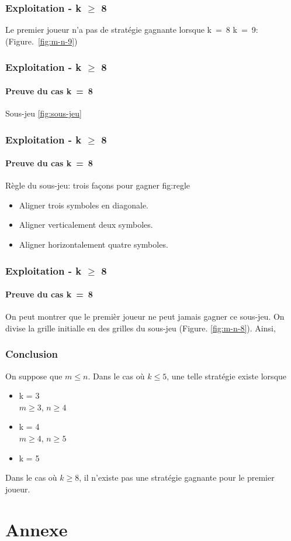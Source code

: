 \documentclass{beamer}
\begin{document}
\begin{frame}
    \frametitle{Exploitation - k $\ge$ 8}
    Le premier joueur n'a pas de stratégie gagnante lorsque k~=~8
        k~=~9: 
            \mbox{(Figure. \ref{fig:m-n-9})}
\end{frame}

\begin{frame}
    \frametitle{Exploitation - k $\ge$ 8}
    \framesubtitle{Preuve du cas k~=~8}
    Sous-jeu \ref{fig:sous-jeu} 
\end{frame}

\begin{frame}
    \frametitle{Exploitation - k $\ge$ 8}
    \framesubtitle{Preuve du cas k~=~8}
    Règle du sous-jeu: trois façons pour gagner  fig:regle
\begin{itemize}
    \item Aligner trois symboles en diagonale.
    \item Aligner verticalement deux symboles.
    \item Aligner horizontalement quatre symboles.
\end{itemize}
    
\end{frame}

\begin{frame}
    \frametitle{Exploitation - k $\ge$ 8}
    \framesubtitle{Preuve du cas k~=~8}
On peut montrer que le premièr joueur ne peut jamais gagner ce sous-jeu. On divise la grille initialle en des grilles du sous-jeu (Figure. \ref{fig:m-n-8}). Ainsi, 
    
\end{frame}

\begin{frame}
    \frametitle{Conclusion}
On suppose que $m \le n$.
Dans le cas où $k \le 5$, une telle stratégie existe lorsque
\begin{itemize}
    \item k = 3\\
        $m \ge 3$, $n \ge 4$
    \item k = 4\\
        $m \ge 4$, $n \ge 5$
    \item k = 5
\end{itemize}
Dans le cas où $k \ge 8$, il n'existe pas une stratégie gagnante pour le premier joueur.
\end{frame}

\section{Annexe}
\end{document}
